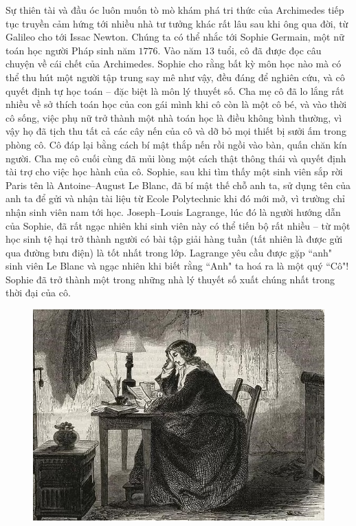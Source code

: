 \begin{multicols}{2}
	Sự thiên tài và đầu óc luôn muốn tò mò khám phá tri thức của Archimedes tiếp tục truyền cảm hứng tới nhiều nhà tư tưởng khác rất lâu sau khi ông qua đời, từ Galileo cho tới Issac Newton. Chúng ta có thể nhắc tới Sophie Germain, một nữ toán học người Pháp sinh năm $1776$. Vào năm $13$ tuổi, cô đã được đọc câu chuyện về cái chết của Archimedes. Sophie cho rằng bất kỳ môn học nào mà có thể thu hút một người tập trung say mê như vậy, đều đáng để nghiên cứu, và cô quyết định tự học toán -- đặc biệt là môn lý thuyết số. Cha mẹ cô đã lo lắng rất nhiều về sở thích toán học của con gái mình khi cô còn là một cô bé, và vào thời cô sống, việc phụ nữ trở thành một nhà toán học là điều không bình thường, vì vậy họ đã tịch thu tất cả các cây nến của cô và dỡ bỏ mọi thiết bị sưởi ấm trong phòng cô. Cô đáp lại bằng cách bí mật thắp nến rồi ngồi vào bàn, quấn chăn kín người. Cha mẹ cô cuối cùng đã mủi lòng một cách thật thông thái và quyết định tài trợ cho việc học hành của cô. Sophie, sau khi tìm thấy một sinh viên sắp rời Paris tên là Antoine--August Le Blanc, đã bí mật thế chỗ anh ta, sử dụng tên của anh ta để gửi và nhận tài liệu từ Ecole Polytechnic khi đó mới mở,  vì trường chỉ nhận sinh viên nam tới học. Joseph--Louis Lagrange, lúc đó là người hướng dẫn của Sophie, đã rất ngạc nhiên khi  sinh viên này có thể tiến bộ rất nhiều -- từ một học sinh tệ hại trở thành người có bài tập giải hàng tuần (tất nhiên là được gửi qua đường bưu điện) là tốt nhất trong lớp. Lagrange yêu cầu được gặp ``anh" sinh viên Le Blanc và ngạc nhiên khi biết rằng ``Anh" ta hoá ra là một quý ``Cô"! Sophie đã trở thành một trong những nhà lý thuyết số xuất chúng nhất trong thời đại của cô.
	\begin{figure}[H]
		\vspace*{5pt}
		\centering
		\captionsetup{labelformat= empty, justification=centering}
		\includegraphics[width= 1\linewidth]{4}

\end{figure}
\end{multicols}
